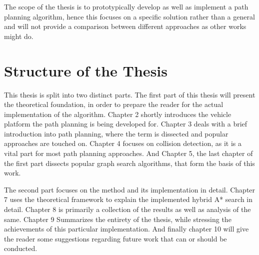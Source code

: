 The scope of the thesis is to prototypically develop as well as implement a path planning algorithm, hence this focuses on a specific solution rather than a general and will not provide a comparison between different approaches as other works might do.

\section{Structure of the Thesis}
This thesis is split into two distinct parts. The first part of this thesis will present the theoretical foundation, in order to prepare the reader for the actual implementation of the algorithm. Chapter 2 shortly introduces the vehicle platform the path planning is being developed for. Chapter 3 deals with a brief introduction into path planning, where the term is dissected and popular approaches are touched on. Chapter 4 focuses on collision detection, as it is a vital part for most path planning approaches. And Chapter 5, the last chapter of the first part dissects popular graph search algorithms, that form the basis of this work.

The second part focuses on the method and its implementation in detail. Chapter 7 uses the theoretical framework to explain the implemented hybrid A* search in detail. Chapter 8 is primarily a collection of the results as well as analysis of the same. Chapter 9 Summarizes the entirety of the thesis, while stressing the achievements of this particular implementation. And finally chapter 10 will give the reader some suggestions regarding future work that can or should be conducted.